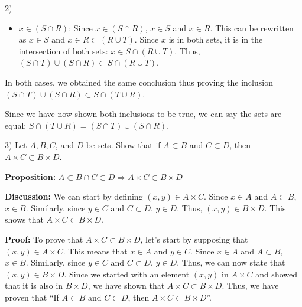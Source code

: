 \begin{paragraph}{2)}
\begin{itemize}
            \item{
                $x \in (S \cap R)$: Since $x \in (S \cap R)$, $x \in S$ and $x \in R$. This
                can be rewritten as $x \in S$ and $x \in R \subset (R \cup T)$. Since $x$ is in
                both sets, it is in the intersection of both sets: $x \in S \cap (R \cup T)$.
                Thus, $(S \cap T) \cup (S \cap R) \subset S \cap (R \cup T)$.
            }
        \end{itemize}

        In both cases, we obtained the same conclusion thus proving the inclusion 
        $(S \cap T) \cup (S \cap R) \subset S \cap (T \cup R)$.
        \spacing

        Since we have now shown both inclusions to be true, we can say the 
        sets are equal: $S \cap (T \cup R) = (S \cap T) \cup (S \cap R)$.

        \proofEnd
    \end{paragraph}

    \bigskip

    \begin{paragraph}{3)}
        Let $A,B,C$, and $D$ be sets.  Show that if $A \subset B$ and $C \subset D$, then $A \times C \subset B \times D$.  

        \spacing\separate\spacing

        \textbf{Proposition:} $A \subset B \cap C \subset D \Rightarrow A \times C \subset B \times D$
        \spacing

        \textbf{Discussion:} We can start by defining $(x, y) \in A \times C$.
        Since $x \in A$ and $A \subset B$, $x \in B$.
        Similarly, since $y \in C$ and $C \subset D$, $y \in D$.
        Thus, $(x, y) \in B \times D$. This shows that $A \times C \subset B \times D$.
        \spacing

        \textbf{Proof:} To prove that $A \times C \subset B \times D$, let's
        start by supposing that $(x, y) \in A \times C$. This means that 
        $x \in A$ and $y \in C$. Since $x \in A$ and $A \subset B$,
        $x \in B$. Similarly, since $y \in C$ and $C \subset D$, $y \in D$.
        Thus, we can now state that $(x, y) \in B \times D$. Since we started with an 
        element $(x, y)$ in $A \times C$ and showed that it is also in $B \times D$,
        we have shown that $A \times C \subset B \times D$. Thus, we have proven that
        ``If $A \subset B$ and $C \subset D$, then $A \times C \subset B \times D$''. 

        \proofEnd

    \end{paragraph}

